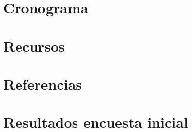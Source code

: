 \documentclass[letter,openright,12pt]{book}
\begin{document}
  
  
  \chapter{Cronograma}
  
  \chapter{Recursos}
  
  
  
  
  \chapter{Referencias}
  
  \renewcommand\appendixname{Anexo}
  
  \appendix
  \chapter{Resultados encuesta inicial} \label{anexo1}
  
  
  
  
\end{document}
